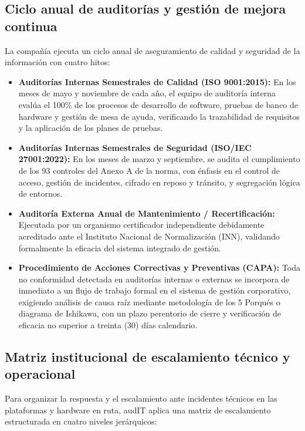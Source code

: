 \subsection{Ciclo anual de auditorías y gestión de mejora continua}\label{sec:1-auditorias}

La compañía ejecuta un ciclo anual de aseguramiento de calidad y seguridad de la información con cuatro hitos:

\begin{itemize}
  \item \textbf{Auditorías Internas Semestrales de Calidad (ISO 9001:2015):} En los meses de mayo y noviembre de cada año, el equipo de auditoría interna evalúa el 100\% de los procesos de desarrollo de software, pruebas de banco de hardware y gestión de mesa de ayuda, verificando la trazabilidad de requisitos y la aplicación de los planes de pruebas.
  \item \textbf{Auditorías Internas Semestrales de Seguridad (ISO/IEC 27001:2022):} En los meses de marzo y septiembre, se audita el cumplimiento de los 93 controles del Anexo A de la norma, con énfasis en el control de acceso, gestión de incidentes, cifrado en reposo y tránsito, y segregación lógica de entornos.
  \item \textbf{Auditoría Externa Anual de Mantenimiento / Recertificación:} Ejecutada por un organismo certificador independiente debidamente acreditado ante el Instituto Nacional de Normalización (INN), validando formalmente la eficacia del sistema integrado de gestión.
  \item \textbf{Procedimiento de Acciones Correctivas y Preventivas (CAPA):} Toda no conformidad detectada en auditorías internas o externas se incorpora de inmediato a un flujo de trabajo formal en el sistema de gestión corporativo, exigiendo análisis de causa raíz mediante metodología de los 5 Porqués o diagrama de Ishikawa, con un plazo perentorio de cierre y verificación de eficacia no superior a treinta (30) días calendario.
\end{itemize}

\subsection{Matriz institucional de escalamiento técnico y operacional}\label{sec:1-escalamiento}

Para organizar la respuesta y el escalamiento ante incidentes técnicos en las plataformas y hardware en ruta, audIT aplica una matriz de escalamiento estructurada en cuatro niveles jerárquicos:

